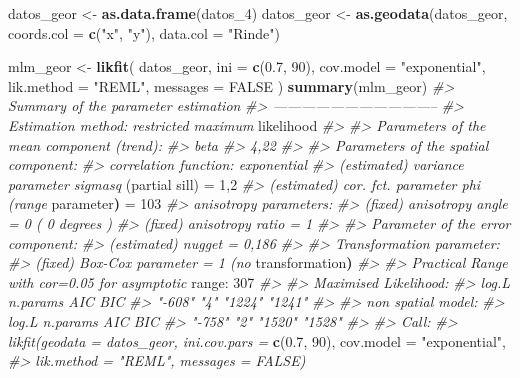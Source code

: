 \documentclass[11pt,b5paper,]{krantz}
\newenvironment{Shaded}{}{}
\newcommand{\CommentTok}[1]{\textcolor[rgb]{0.38,0.63,0.69}{\textit{#1}}}
\newcommand{\DataTypeTok}[1]{\textcolor[rgb]{0.56,0.13,0.00}{#1}}
\newcommand{\DecValTok}[1]{\textcolor[rgb]{0.25,0.63,0.44}{#1}}
\newcommand{\ErrorTok}[1]{\textcolor[rgb]{1.00,0.00,0.00}{\textbf{#1}}}
\newcommand{\FloatTok}[1]{\textcolor[rgb]{0.25,0.63,0.44}{#1}}
\newcommand{\KeywordTok}[1]{\textcolor[rgb]{0.00,0.44,0.13}{\textbf{#1}}}
\newcommand{\NormalTok}[1]{#1}
\newcommand{\OperatorTok}[1]{\textcolor[rgb]{0.40,0.40,0.40}{#1}}
\newcommand{\OtherTok}[1]{\textcolor[rgb]{0.00,0.44,0.13}{#1}}
\newcommand{\StringTok}[1]{\textcolor[rgb]{0.25,0.44,0.63}{#1}}
\begin{document}
\begin{Shaded}
\begin{Highlighting}[]
\NormalTok{datos_geor <-}\StringTok{ }\KeywordTok{as.data.frame}\NormalTok{(datos_}\DecValTok{4}\NormalTok{)}
\NormalTok{datos_geor <-}
\StringTok{  }\KeywordTok{as.geodata}\NormalTok{(datos_geor,}
             \DataTypeTok{coords.col =} \KeywordTok{c}\NormalTok{(}\StringTok{"x"}\NormalTok{, }\StringTok{"y"}\NormalTok{),}
             \DataTypeTok{data.col =} \StringTok{"Rinde"}\NormalTok{)}

\NormalTok{mlm_geor <-}
\StringTok{  }\KeywordTok{likfit}\NormalTok{(}
\NormalTok{    datos_geor,}
    \DataTypeTok{ini =} \KeywordTok{c}\NormalTok{(}\FloatTok{0.7}\NormalTok{, }\DecValTok{90}\NormalTok{),}
    \DataTypeTok{cov.model =} \StringTok{"exponential"}\NormalTok{,}
    \DataTypeTok{lik.method =} \StringTok{"REML"}\NormalTok{,}
    \DataTypeTok{messages =} \OtherTok{FALSE}
\NormalTok{  )}
\KeywordTok{summary}\NormalTok{(mlm_geor)}
\CommentTok{#> Summary of the parameter estimation}
\CommentTok{#> -----------------------------------}
\CommentTok{#> Estimation method: restricted maximum}
\NormalTok{likelihood}
\CommentTok{#>}
\CommentTok{#> Parameters of the mean component (trend):}
\CommentTok{#> beta}
\CommentTok{#> 4,22}
\CommentTok{#>}
\CommentTok{#> Parameters of the spatial component:}
\CommentTok{#> correlation function: exponential}
\CommentTok{#> (estimated) variance parameter sigmasq}
\NormalTok{(partial sill) =}\StringTok{ }\DecValTok{1}\NormalTok{,}\DecValTok{2}
\CommentTok{#> (estimated) cor. fct. parameter phi (range}
\NormalTok{parameter}\ErrorTok{)}\NormalTok{ =}\StringTok{ }\DecValTok{103}
\CommentTok{#> anisotropy parameters:}
\CommentTok{#> (fixed) anisotropy angle = 0 ( 0 degrees )}
\CommentTok{#> (fixed) anisotropy ratio = 1}
\CommentTok{#>}
\CommentTok{#> Parameter of the error component:}
\CommentTok{#> (estimated) nugget = 0,186}
\CommentTok{#>}
\CommentTok{#> Transformation parameter:}
\CommentTok{#> (fixed) Box-Cox parameter = 1 (no}
\NormalTok{transformation}\ErrorTok{)}
\CommentTok{#>}
\CommentTok{#> Practical Range with cor=0.05 for asymptotic}
\NormalTok{range}\OperatorTok{:}\StringTok{ }\DecValTok{307}
\CommentTok{#>}
\CommentTok{#> Maximised Likelihood:}
\CommentTok{#> log.L n.params AIC BIC}
\CommentTok{#> "-608" "4" "1224" "1241"}
\CommentTok{#>}
\CommentTok{#> non spatial model:}
\CommentTok{#> log.L n.params AIC BIC}
\CommentTok{#> "-758" "2" "1520" "1528"}
\CommentTok{#>}
\CommentTok{#> Call:}
\CommentTok{#> likfit(geodata = datos_geor, ini.cov.pars =}
\KeywordTok{c}\NormalTok{(}\FloatTok{0.7}\NormalTok{, }\DecValTok{90}\NormalTok{), cov.model =}\StringTok{ "exponential"}\NormalTok{,}
\CommentTok{#> lik.method = "REML", messages = FALSE)}
\end{Highlighting}
\end{Shaded}
\end{document}
